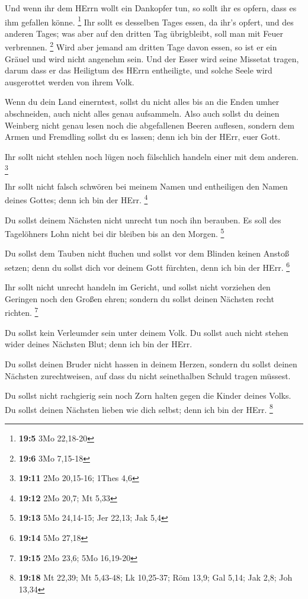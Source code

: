  Und wenn ihr dem HErrn wollt ein Dankopfer tun, so sollt
ihr es opfern, dass es ihm gefallen könne. \footnote{\textbf{19:5} 3Mo
  22,18-20}  Ihr sollt es desselben Tages essen, da ihr's
opfert, und des anderen Tages; was aber auf den dritten Tag übrigbleibt,
soll man mit Feuer verbrennen. \footnote{\textbf{19:6} 3Mo 7,15-18}
 Wird aber jemand am dritten Tage davon essen, so ist er ein
Gräuel und wird nicht angenehm sein.  Und der Esser wird
seine Missetat tragen, darum dass er das Heiligtum des HErrn
entheiligte, und solche Seele wird ausgerottet werden von ihrem Volk.

 Wenn du dein Land einerntest, sollst du nicht alles bis an
die Enden umher abschneiden, auch nicht alles genau aufsammeln.
 Also auch sollst du deinen Weinberg nicht genau lesen noch
die abgefallenen Beeren auflesen, sondern dem Armen und Fremdling sollst
du es lassen; denn ich bin der HErr, euer Gott.

 Ihr sollt nicht stehlen noch lügen noch fälschlich handeln
einer mit dem anderen. \footnote{\textbf{19:11} 2Mo 20,15-16; 1Thes 4,6}

 Ihr sollt nicht falsch schwören bei meinem Namen und
entheiligen den Namen deines Gottes; denn ich bin der HErr. \footnote{\textbf{19:12}
  2Mo 20,7; Mt 5,33}

 Du sollst deinem Nächsten nicht unrecht tun noch ihn
berauben. Es soll des Tagelöhners Lohn nicht bei dir bleiben bis an den
Morgen. \footnote{\textbf{19:13} 5Mo 24,14-15; Jer 22,13; Jak 5,4}

 Du sollst dem Tauben nicht fluchen und sollst vor dem
Blinden keinen Anstoß setzen; denn du sollst dich vor deinem Gott
fürchten, denn ich bin der HErr. \footnote{\textbf{19:14} 5Mo 27,18}

 Ihr sollt nicht unrecht handeln im Gericht, und sollst
nicht vorziehen den Geringen noch den Großen ehren; sondern du sollst
deinen Nächsten recht richten. \footnote{\textbf{19:15} 2Mo 23,6; 5Mo
  16,19-20}

 Du sollst kein Verleumder sein unter deinem Volk. Du
sollst auch nicht stehen wider deines Nächsten Blut; denn ich bin der
HErr.

 Du sollst deinen Bruder nicht hassen in deinem Herzen,
sondern du sollst deinen Nächsten zurechtweisen, auf dass du nicht
seinethalben Schuld tragen müssest.

 Du sollst nicht rachgierig sein noch Zorn halten gegen die
Kinder deines Volks. Du sollst deinen Nächsten lieben wie dich selbst;
denn ich bin der HErr. \footnote{\textbf{19:18} Mt 22,39; Mt 5,43-48; Lk
  10,25-37; Röm 13,9; Gal 5,14; Jak 2,8; Joh 13,34}

